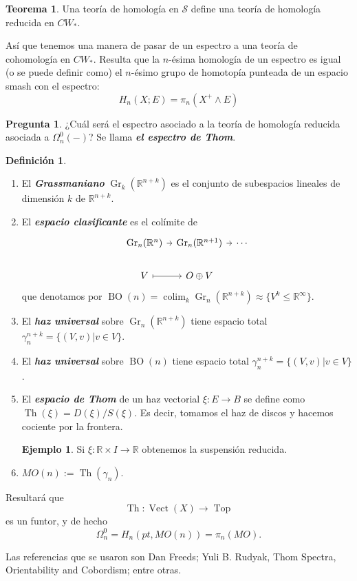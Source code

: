 \documentclass[spanish]{book}
\theoremstyle{definition}
\newtheorem*{defn}{Definición}
\newtheorem*{teo}{Teorema}
\newtheorem*{ejem}{Ejemplo}
\newtheorem*{pregunta}{Pregunta}
\newcommand{\R}{\mathbb{R}}
\begin{document}
	\begin{teo}
		Una teoría de homología en $\mathcal{S}$ define una teoría de homología reducida en $CW_*$.
	\end{teo}
	Así que tenemos una manera de pasar de un espectro a una teoría de cohomología en $CW_*$. Resulta que la $n$-ésima homología de un espectro es igual (o se puede definir como) el $n$-ésimo grupo de homotopía punteada de un espacio smash con el espectro:
	\[H_n(X;E)=\pi_n(X^+\wedge E)\]
	\begin{pregunta}
		¿Cuál será el espectro asociado a la teoría de homología reducida asociada a $\Omega_n^0(-)$? Se llama \textbf{\textit{el espectro de Thom}}.
	\end{pregunta}
	\begin{defn}\leavevmode
		\begin{enumerate}
			\item El \textbf{\textit{Grassmaniano}} $\operatorname{Gr}_k(\R^{n+k})$ es el conjunto de subespacios lineales de dimensión $k$ de $\R^{n+k}$.
			\item El \textbf{\textit{espacio clasificante}} es el colímite de
			\[\begin{tikzcd}[column sep=tiny]
				\operatorname{Gr}_n(\R^n)\arrow[r]&\operatorname{Gr}_n(\R^{n+1})\arrow[r]&\cdots\\
				V\arrow[r,mapsto]&O\oplus V
			\end{tikzcd}\]
			que denotamos por $\operatorname{BO}(n)=\operatorname{colim}_k\operatorname{Gr}_n(\R^{n+k})\approx\{V^k\leq\R^\infty\}$.
			\item El \textbf{\textit{haz universal}} sobre $\operatorname{Gr}_n(\R^{n+k})$ tiene espacio total $\gamma^{n+k}_n=\{(V,v)|v\in V\}$.
			\item El \textbf{\textit{haz universal}} sobre $\operatorname{BO}(n)$ tiene espacio total $\gamma^{n+k}_n=\{(V,v)|v\in V\}$.
			\item El \textbf{\textit{espacio de Thom}} de un haz vectorial $\xi:E\to B$ se define como $\operatorname{Th}(\xi)=D(\xi)/S(\xi)$. Es decir, tomamos el haz de discos y hacemos cociente por la frontera.
				\begin{ejem}
				Si $\xi:\R\times I\to\R$ obtenemos la suspensión reducida.
			\end{ejem}
			
			\item $MO(n):=\operatorname{Th}(\gamma_n)$.
		\end{enumerate}
	\end{defn}
	Resultará que
	\[\operatorname{Th}:\operatorname{Vect}(X)\to\operatorname{Top}\]
	es un funtor, y de hecho
	\[\Omega_n^0=H_n(pt,MO(n))=\pi_n(MO).\]

	Las referencias que se usaron son Dan Freeds; Yuli B. Rudyak, Thom Spectra, Orientability and Cobordism; entre otras.
\end{document}
